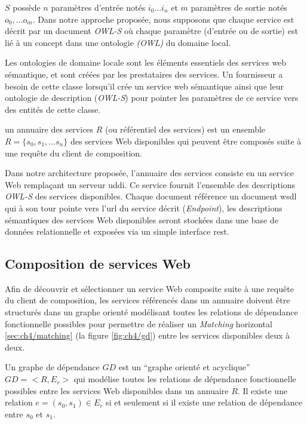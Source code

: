    $S$ possède $n$ paramètres d'entrée notés $i_0...i_n$ et $m$
   paramètres de sortie notés $o_0,...o_m$. Dans notre approche
   proposée, nous supposons que chaque service est décrit par un
   document \textit{OWL-S} où chaque paramètre (d'entrée ou de sortie)
   est lié à un concept dans une ontologie \textit{(OWL)} du domaine
   local.\medskip


   Les ontologies de domaine locale sont les éléments essentiels des
   services web sémantique, et sont créées par les prestataires des services.
   Un fournisseur a besoin de cette classe lorsqu'il crée un service web
   sémantique ainsi que leur ontologie de description (\textit{OWL-S})
   pour pointer les paramètres de ce service vers des entités de cette
   classe.

   \begin{mydef}
     un annuaire des services $R$ (ou référentiel des services) est un
     ensemble $R =\{s_0, s_1, ...s_n\}$ des services Web disponibles
     qui peuvent être composés suite à une requête du client de
     composition.
  \end{mydef}

  Dans notre architecture proposée, l'annuaire des services consiste
  en un service Web remplaçant un serveur \acrshort{uddi}. Ce service
  fournit l'ensemble des descriptions \textit{OWL-S} des services
  disponibles. Chaque document référence un document \acrshort{wsdl}
  qui à son tour pointe vers l'\acrshort{url} du service décrit
  (\textit{Endpoint}), les descriptions sémantiques des services Web
  disponibles seront stockées dans une base de données relationnelle
  et exposées via un simple interface \acrshort{rest}.\medskip

  

  \subsection{Composition de services Web}
  \label{sec:basic:composition}
  Afin de découvrir et sélectionner un service Web composite suite à
  une requête du client de composition, les services référencés dans un
  annuaire doivent être structurés dans un graphe orienté modélisant
  toutes les relations de dépendance fonctionnelle possibles pour permettre 
  de réaliser un \textit{Matching} horizontal \ref{sec:ch4/matching}
  (la figure \ref{fig:ch4/gd}) entre les services disponibles deux à deux.\medskip

  \begin{mydef}
    Un graphe de dépendance $GD$ est un ``graphe orienté et
    acyclique'' $GD=<R, E_r>$ qui modélise toutes les relations de
    dépendance fonctionnelle possibles entre les services Web
    disponibles dans un annuaire $R$. Il existe une relation $e=(s_0,
    s_1) \in E_r$ si et seulement si il existe une relation de
    dépendance entre $s_0$ et $s_1$.
  \end{mydef}

